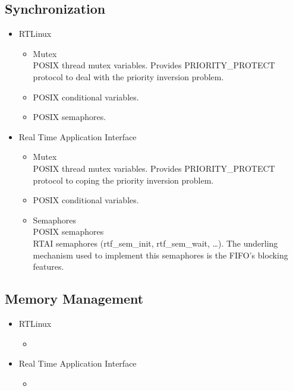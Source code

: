 \documentclass[paper=letter, fontsize=12pt]{article}
\newcommand\rtai{Real Time Application Interface}
\newcommand\rtlinux{RTLinux}
\begin{document}
    \subsection{Synchronization}
    \begin{itemize}
        \item \rtlinux
        \begin{itemize}
            \item Mutex
                \\ POSIX thread mutex variables. Provides PRIORITY\_PROTECT protocol to deal with the priority inversion problem. 
            \item POSIX conditional variables.
            \item POSIX semaphores.
        \end{itemize}
        \item \rtai
        \begin{itemize}
            \item Mutex
                \\ POSIX thread mutex variables. Provides PRIORITY\_PROTECT protocol to coping the priority inversion problem. 
            \item POSIX conditional variables.
            \item Semaphores
                \\ POSIX semaphores
                \\ RTAI semaphores (rtf\_sem\_init, rtf\_sem\_wait, \dots). The underling mechanism used to implement this semaphores is the FIFO's blocking features. 
        \end{itemize}
    \end{itemize}
    
    \subsection{Memory Management}
    \begin{itemize}
        \item \rtlinux
        \begin{itemize}
            \item 
        \end{itemize}
        \item \rtai
        \begin{itemize}
            \item 
        \end{itemize}
    \end{itemize}
    
\end{document}
